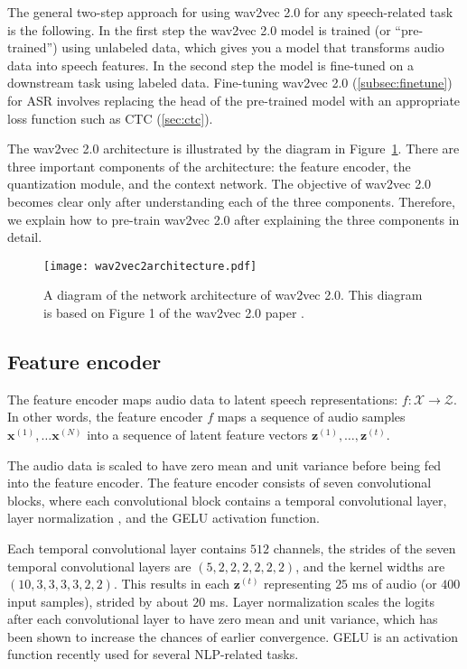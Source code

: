 The general two-step approach for using wav2vec 2.0 for any speech-related task is the following.
In the first step the wav2vec 2.0 model is trained (or ``pre-trained'') using unlabeled data, which
gives you a model that transforms audio data into speech features.
In the second step the model is fine-tuned on a downstream task using labeled data. 
Fine-tuning wav2vec 2.0 (\ref{subsec:finetune}) for ASR involves replacing the head of the 
pre-trained model with an appropriate loss function such as CTC (\ref{sec:ctc}).

The wav2vec 2.0 architecture is illustrated by the diagram in Figure~\ref{fig:wav2vec2_architecture}.
There are three important components of the architecture:
the feature encoder, the quantization module, and the context network.
The objective of wav2vec 2.0 becomes clear only after understanding each of the three
components. Therefore, we explain how to pre-train wav2vec 2.0 after explaining
the three components in detail.

\begin{figure}[!ht]
    \centering
    \texttt{[image: wav2vec2architecture.pdf]}
    \caption{A diagram of the network architecture of wav2vec 2.0. This diagram is based on Figure 1 of the wav2vec 2.0 paper \cite{baevski2020wav2vec}.}
    \label{fig:wav2vec2_architecture}

\end{figure}
\subsection{Feature encoder}
The feature encoder maps audio data to latent speech representations: $f: \mathcal{X} \rightarrow \mathcal{Z}$.
In other words, the feature encoder $f$ maps a sequence of audio samples $\mathbf{x}^{(1)}, \dots \mathbf{x}^{(N)}$ into a sequence of latent feature vectors $\mathbf{z}^{(1)}, \dots, \mathbf{z}^{(t)}$.

The audio data is scaled to have zero mean and unit variance before being fed into the feature encoder. 
The feature encoder consists of seven convolutional blocks, where each convolutional block contains a temporal convolutional layer,
layer normalization \cite{ba2016layer}, and the GELU \cite{hendrycks2016gaussian} activation function.

Each temporal convolutional layer contains $512$ channels, the strides of the seven temporal convolutional layers are $(5,2,2,2,2,2,2)$, and the kernel widths are $(10,3,3,3,3,2,2)$.
This results in each $\mathbf{z}^{(t)}$ representing $25$ ms of audio (or $400$ input samples), strided by about $20$ ms.
Layer normalization scales the logits after each convolutional layer to have zero mean and unit variance, which has been shown to increase the chances of earlier convergence.
GELU is an activation function recently used for several NLP-related tasks.


